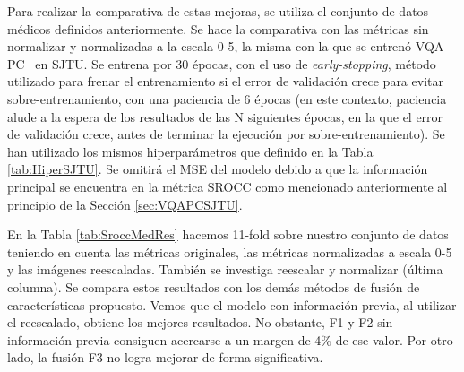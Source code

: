 Para realizar la comparativa de estas mejoras, se utiliza el conjunto de datos 
médicos definidos anteriormente. Se hace la comparativa con las métricas sin 
normalizar y normalizadas a la escala 0-5, la misma con la que se entrenó VQA-PC~\cite{VQA-PC} en SJTU. 
Se entrena por 30 épocas, con el uso de \emph{early-stopping}, método utilizado para frenar el entrenamiento 
si el error de validación crece para evitar sobre-entrenamiento, con una paciencia 
de 6 épocas (en este contexto, paciencia alude a la espera de los resultados de 
las N siguientes épocas, en la que el error de validación crece, antes de terminar 
la ejecución por sobre-entrenamiento). 
Se han utilizado los mismos hiperparámetros que definido en la Tabla \ref{tab:HiperSJTU}.
Se omitirá el MSE del modelo debido a que la información principal se encuentra 
en la métrica SROCC como mencionado anteriormente al principio de la Sección \ref{sec:VQAPCSJTU}.

En la Tabla \ref{tab:SroccMedRes} hacemos 11-fold sobre nuestro conjunto de datos teniendo en cuenta las métricas originales, las métricas
normalizadas a escala 0-5 y las imágenes reescaladas. También se investiga reescalar y normalizar (última columna).
Se compara estos resultados con los demás métodos de fusión de características propuesto.
Vemos que el modelo con información previa, al utilizar el reescalado, obtiene los mejores resultados.
No obstante, F1 y F2 sin información previa consiguen acercarse a un margen de 4\% de ese valor. 
Por otro lado, la fusión F3 no logra mejorar de forma significativa. 


